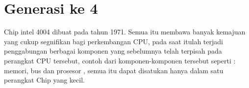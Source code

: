 \section{Generasi ke 4}
Chip intel 4004 dibuat pada tahun 1971. Semua itu membawa banyak kemajuan yang cukup segnifikan bagi perkembangan CPU, pada saat itulah terjadi  penggabungan  berbagai komponen yang sebelumnya telah terpisah pada perangkat CPU tersebut, contoh dari komponen-komponen tersebut seperti : memori, bus dan prosesor , semua itu dapat disatukan hanya dalam satu perangkat Chip yang kecil.

